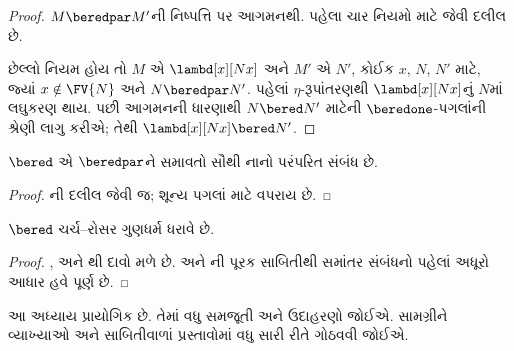 \begin{proof}
  $M \beredpar M'$ની નિષ્પત્તિ પર આગમનથી.
  પહેલા ચાર નિયમો માટે
   જેવી દલીલ છે.

  છેલ્લો નિયમ  હોય તો
  $M$ એ $\lambd[x][Nx]$ અને $M'$ એ $N'$, કોઈક
  $x$, $N$, $N'$ માટે, જ્યાં
  $x \notin \FV{N}$ અને $N \beredpar N'$.
  પહેલાં $\eta$-રૂપાંતરણથી
  $\lambd[x][Nx]$નું $N$માં લઘુકરણ થાય.
  પછી આગમનની ધારણાથી $N \bered N'$ માટેની
  $\beredone$-પગલાંની શ્રેણી લાગુ કરીએ;
  તેથી $\lambd[x][Nx] \bered N'$.
\end{proof}

\begin{lem}
  $\bered$ એ $\beredpar$ને સમાવતો સૌથી નાનો
  પરંપરિત સંબંધ છે.
\end{lem}

\begin{proof}
  ની દલીલ જેવી જ; શૂન્ય પગલાં
  માટે  વપરાય છે.
\end{proof}

\begin{thm}
  $\bered$ ચર્ચ--રોસર ગુણધર્મ ધરાવે છે.
\end{thm}

\begin{proof}
  ,  અને
  થી દાવો મળે છે.
   અને ની
  પૂરક સાબિતીથી સમાંતર સંબંધનો પહેલાં અધૂરો આધાર હવે પૂર્ણ છે.
\end{proof}
\endgroup


\OLEndChapterHook
\endgroup


\begingroup
\makeatletter{}\makeatother

\label{guunit:OLP-0373}


\begin{editorial}
  આ અધ્યાય પ્રાયોગિક છે. તેમાં વધુ સમજૂતી અને
  ઉદાહરણો જોઈએ. સામગ્રીને વ્યાખ્યાઓ અને
  સાબિતીવાળાં પ્રસ્તાવોમાં વધુ સારી રીતે ગોઠવવી
  જોઈએ.
\end{editorial}

